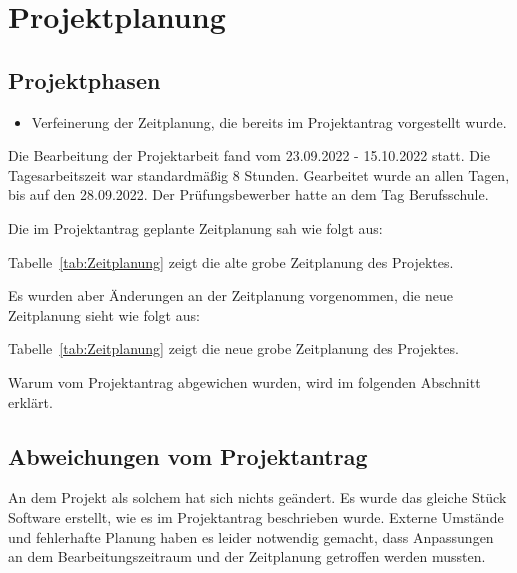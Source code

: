 \section{Projektplanung} 
\label{sec:Projektplanung}


\subsection{Projektphasen}
\label{sec:Projektphasen}

\begin{itemize}
	\item Verfeinerung der Zeitplanung, die bereits im Projektantrag vorgestellt wurde.
\end{itemize}

Die Bearbeitung der Projektarbeit fand vom 23.09.2022 - 15.10.2022 statt. Die Tagesarbeitszeit war standardmäßig 8 Stunden. Gearbeitet wurde an allen Tagen, bis auf den 28.09.2022. Der Prüfungsbewerber hatte an dem Tag Berufsschule. 

Die im Projektantrag geplante Zeitplanung sah wie folgt aus:

\newpage

Tabelle~\ref{tab:Zeitplanung} zeigt die alte grobe Zeitplanung des Projektes.


Es wurden aber Änderungen an der Zeitplanung vorgenommen, die neue Zeitplanung sieht wie folgt aus:

Tabelle~\ref{tab:Zeitplanung} zeigt die neue grobe Zeitplanung des Projektes.

Warum vom Projektantrag abgewichen wurden, wird im folgenden Abschnitt erklärt.

\subsection{Abweichungen vom Projektantrag}
\label{sec:AbweichungenProjektantrag}

An dem Projekt als solchem hat sich nichts geändert. Es wurde das gleiche Stück Software erstellt, wie es im Projektantrag beschrieben wurde. Externe Umstände und fehlerhafte Planung haben es leider notwendig gemacht, dass Anpassungen an dem Bearbeitungszeitraum und der Zeitplanung getroffen werden mussten.

